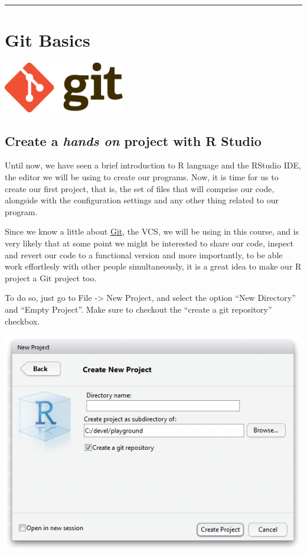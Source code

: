 \documentclass[]{article}
\begin{document}
\begin{center}\rule{0.5\linewidth}{\linethickness}\end{center}

\section{Git Basics}\label{git-basics}

\begin{center}\includegraphics[width=200px]{figures/git} \end{center}

\subsection{\texorpdfstring{Create a \emph{hands on} project with R
Studio}{Create a hands on project with R Studio}}\label{create-a-hands-on-project-with-r-studio}

Until now, we have seen a brief introduction to R language and the
RStudio IDE, the editor we will be using to create our programs. Now, it
is time for us to create our first project, that is, the set of files
that will comprise our code, alongside with the configuration settings
and any other thing related to our program.

Since we know a little about \href{https://git-scm.com/}{Git}, the VCS,
we will be using in this course, and is very likely that at some point
we might be interested to share our code, inspect and revert our code to
a functional version and more importantly, to be able work effortlesly
with other people simultaneously, it is a great idea to make our R
project a Git project too.

To do so, just go to File -\textgreater{} New Project, and select the
option ``New Directory'' and ``Empty Project''. Make sure to checkout
the ``create a git repository'' checkbox.

\begin{center}\includegraphics[width=500px]{figures/new_project} \end{center}
\end{document}
